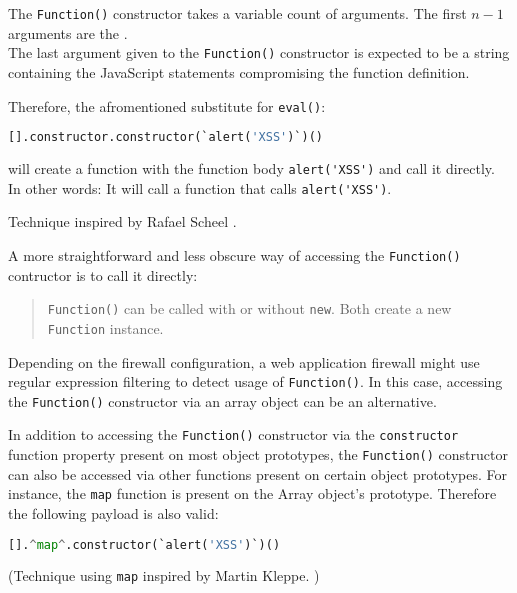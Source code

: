 The \verb|Function()| constructor takes a variable count of arguments. The first $n - 1$ arguments are the . \cite{js/function} \\
The last argument given to the \verb|Function()| constructor is expected to be a string containing the JavaScript statements compromising the function definition. \cite{js/function}

Therefore, the afromentioned substitute for \verb|eval()|:

\begin{lstlisting}[style=basicStyle,language=Python]
[].constructor.constructor(`alert('XSS')`)()
\end{lstlisting}

will create a function with the function body \verb|alert('XSS')| and call it directly.
In other words: It will call a function that calls \verb|alert('XSS')|.

Technique inspired by Rafael Scheel \cite{onecons/wafbypass}.

A more straightforward and less obscure way of accessing the \verb|Function()| contructor is to call it directly:
\begin{quote}
	\verb|Function()| can be called with or without \verb|new|. Both create a new \verb|Function| instance. \cite{js/function}
\end{quote}
Depending on the firewall configuration, a web application firewall might use regular expression filtering to detect usage of \verb|Function()|.
In this case, accessing the \verb|Function()| constructor via an array object can be an alternative.

In addition to accessing the \verb|Function()| constructor via the \verb|constructor| function property present on most object prototypes, the \verb|Function()| constructor can also be accessed via other functions present on certain object prototypes. For instance, the \verb|map| function is present on the Array object's prototype. Therefore the following payload is also valid:

\begin{lstlisting}[style=basicStyle,language=Python,escapeinside=\^\^]
[].^map^.constructor(`alert('XSS')`)()
\end{lstlisting}

(Technique using \verb|map| inspired by Martin Kleppe. \cite{mk/elementsVid})

